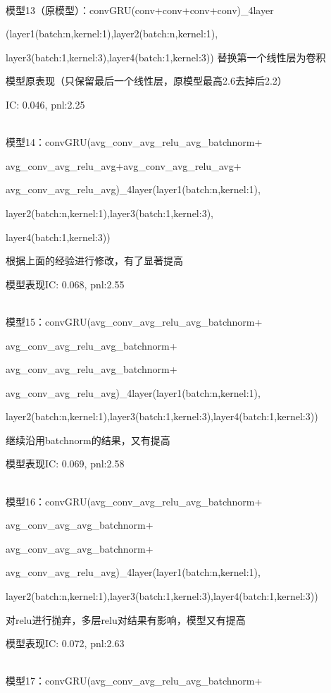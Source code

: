 \documentclass[11pt]{ctexart}
\begin{document}
~\\
模型13（原模型）：convGRU(conv+conv+conv+conv)\_4layer

(layer1(batch:n,kernel:1),layer2(batch:n,kernel:1),

layer3(batch:1,kernel:3),layer4(batch:1,kernel:3)) 替换第一个线性层为卷积

模型原表现（只保留最后一个线性层，原模型最高2.6去掉后2.2）

{\kaishu \small IC: 0.046, pnl:2.25}

~\\
模型14：convGRU(avg\_conv\_avg\_relu\_avg\_batchnorm+

avg\_conv\_avg\_relu\_avg+avg\_conv\_avg\_relu\_avg+

avg\_conv\_avg\_relu\_avg)\_4layer(layer1(batch:n,kernel:1), 

layer2(batch:n,kernel:1),layer3(batch:1,kernel:3),

layer4(batch:1,kernel:3))

根据上面的经验进行修改，有了显著提高

模型表现{\kaishu \small IC: 0.068, pnl:2.55}

~\\
模型15：convGRU(avg\_conv\_avg\_relu\_avg\_batchnorm+

avg\_conv\_avg\_relu\_avg\_batchnorm+

avg\_conv\_avg\_relu\_avg\_batchnorm+

avg\_conv\_avg\_relu\_avg)\_4layer(layer1(batch:n,kernel:1), 

layer2(batch:n,kernel:1),layer3(batch:1,kernel:3),layer4(batch:1,kernel:3))

继续沿用batchnorm的结果，又有提高

模型表现{\kaishu \small IC: 0.069, pnl:2.58}

~\\
模型16：convGRU(avg\_conv\_avg\_relu\_avg\_batchnorm+

avg\_conv\_avg\_avg\_batchnorm+

avg\_conv\_avg\_avg\_batchnorm+

avg\_conv\_avg\_relu\_avg)\_4layer(layer1(batch:n,kernel:1), 

layer2(batch:n,kernel:1),layer3(batch:1,kernel:3),layer4(batch:1,kernel:3))

对relu进行抛弃，多层relu对结果有影响，模型又有提高

模型表现{\kaishu \small IC: 0.072, pnl:2.63}

~\\
模型17：convGRU(avg\_conv\_avg\_relu\_avg\_batchnorm+
\end{document}
